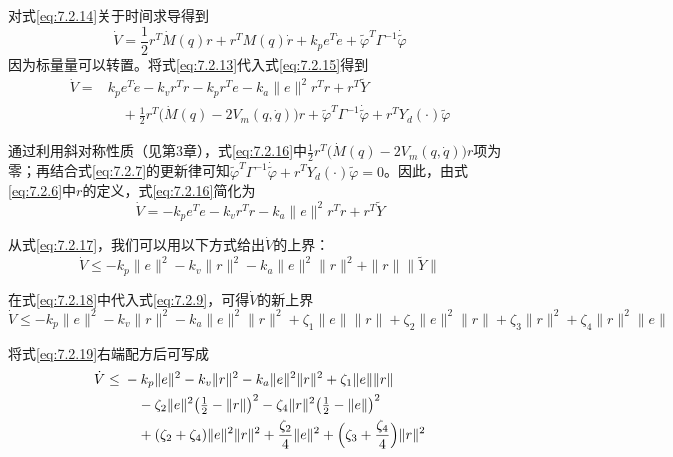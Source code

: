 \documentclass[UTF8]{ctexart}
\begin{document}
对式\eqref{eq:7.2.14}关于时间求导得到
\begin{equation}\label{eq:7.2.15}
\dot{V} = \frac{1}{2}r^T\dot{M}(q)r + r^T M(q)\dot{r} + k_p e^T\dot{e} + \tilde{\varphi}^T \Gamma^{-1}\dot{\tilde{\varphi}}
\end{equation}
因为标量量可以转置。将式\eqref{eq:7.2.13}代入式\eqref{eq:7.2.15}得到
\begin{equation}\label{eq:7.2.16}
\begin{aligned}
\dot{V} = {} & k_p e^T\dot{e} - k_v r^T r - k_p r^T e - k_a\|e\|^2 r^T r + r^T\tilde{Y} \\
& \quad {} + \frac{1}{2} r^T \bigl( \dot{M}(q) - 2V_m(q,\dot{q}) \bigr) r + \tilde{\varphi}^T \Gamma^{-1}\dot{\tilde{\varphi}} + r^T Y_d(\cdot)\tilde{\varphi}
\end{aligned}
\end{equation}

通过利用斜对称性质（见第3章），式\eqref{eq:7.2.16}中$\frac{1}{2} r^T \bigl( \dot{M}(q) - 2V_m(q,\dot{q}) \bigr) r$项为零；再结合式\eqref{eq:7.2.7}的更新律可知$\tilde{\varphi}^T \Gamma^{-1}\dot{\tilde{\varphi}}+r^T Y_d(\cdot)\tilde{\varphi}=0$。因此，由式\eqref{eq:7.2.6}中$r$的定义，式\eqref{eq:7.2.16}简化为
\begin{equation}\label{eq:7.2.17}
\dot{V} = -k_p e^T e - k_v r^T r - k_a\|e\|^2 r^T r + r^T\tilde{Y}
\end{equation}

从式\eqref{eq:7.2.17}，我们可以用以下方式给出$\dot{V}$的上界：
\begin{equation}\label{eq:7.2.18}
\dot{V} \leq -k_p \|e\|^2 - k_v \|r\|^2 - k_a \|e\|^2 \|r\|^2 + \|r\|\|\tilde{Y}\|
\end{equation}

在式\eqref{eq:7.2.18}中代入式\eqref{eq:7.2.9}，可得$\dot{V}$的新上界
\begin{equation}\label{eq:7.2.19}
\dot{V} \leq -k_p \|e\|^2 - k_v \|r\|^2 - k_a \|e\|^2 \|r\|^2 + \zeta_1 \|e\| \|r\| + \zeta_2 \|e\|^2 \|r\| + \zeta_3 \|r\|^2 + \zeta_4 \|r\|^2 \|e\|
\end{equation}

将式\eqref{eq:7.2.19}右端配方后可写成
\begin{equation}\label{eq:7.2.20}
\begin{aligned}
\dot{V} \leq {} & -k_p \|e\|^2 - k_v \|r\|^2 - k_a \|e\|^2 \|r\|^2 + \zeta_1 \|e\| \|r\| \\
& \quad {} - \zeta_2 \|e\|^2 \bigl(\tfrac{1}{2} - \|r\|\bigr)^2 - \zeta_4 \|r\|^2 \bigl(\tfrac{1}{2} - \|e\|\bigr)^2 \\
& \quad {} + (\zeta_2 + \zeta_4) \|e\|^2 \|r\|^2 + \frac{\zeta_2}{4} \|e\|^2 + \Bigl(\zeta_3 + \frac{\zeta_4}{4}\Bigr) \|r\|^2
\end{aligned}
\end{equation}
\end{document}
